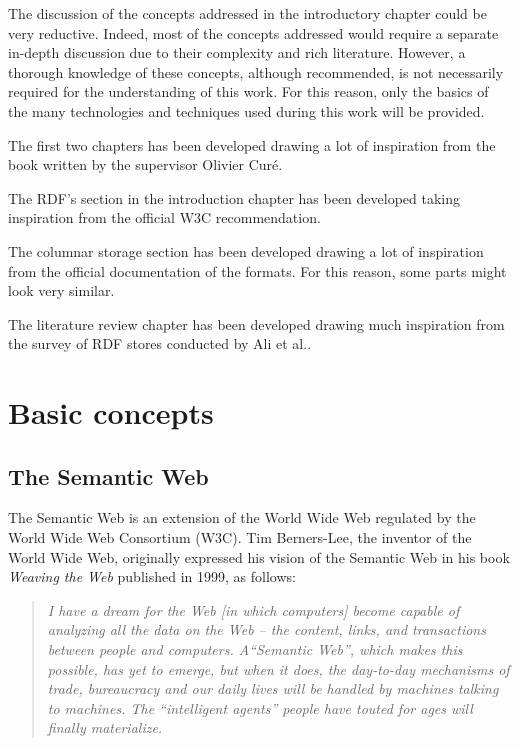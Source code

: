 \documentclass[10pt, a4paper]{report}
\begin{document}
The discussion of the concepts addressed in the introductory chapter could be very reductive. Indeed, most of the concepts addressed would require a separate in-depth discussion due to their complexity and rich literature. However, a thorough knowledge of these concepts, although recommended, is not necessarily required for the understanding of this work. For this reason, only the basics of the many technologies and techniques used during this work will be provided.

The first two chapters has been developed drawing a lot of inspiration from the book\cite{rdf_database_system} written by the supervisor Olivier Curé.

The RDF's section in the introduction chapter has been developed taking inspiration from the official W3C recommendation\cite{rdf_w3c}.

The columnar storage section has been developed drawing a lot of inspiration from the official documentation of the formats. For this reason, some parts might look very similar.

The literature review chapter has been developed drawing much inspiration from the survey of RDF stores conducted by Ali et al.\cite{rdf_store_survey}.


\chapter{Basic concepts}


\section{The Semantic Web}

The Semantic Web is an extension of the World Wide Web regulated by the World Wide Web Consortium (W3C). Tim Berners-Lee, the inventor of the World Wide Web, originally expressed his vision of the Semantic Web in his book \textit{Weaving the Web}\cite{weaving_the_web_book} published in 1999, as follows:

\begin{quote}

	\textit{I have a dream for the Web [in which computers] become capable of analyzing all the data on the Web – the content, links, and transactions between people and computers. A``Semantic Web'', which makes this possible, has yet to emerge, but when it does, the day-to-day mechanisms of trade, bureaucracy and our daily lives will be handled by machines talking to machines. The ``intelligent agents'' people have touted for ages will finally materialize.}

\end{quote}
\end{document}
